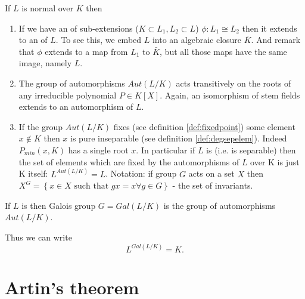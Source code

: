 \begin{remark}
  If $L$ is normal over $K$ then
  \begin{enumerate}
  \item If we have an  of sub-extensions
    ($K \subset L_1, L_2 \subset L$)
    $\phi: L_1 \cong L_2$ then it extends to an
     of $L$.  To see this, we embed $L$ into
    an algebraic closure $\bar{K}$. And remark that $\phi$ extends to a
    map from $L_1$ to $\bar{K}$, but all those maps have the same image,
    namely $L$.  
  \item The group of automorphisms $Aut\left(L/K\right)$ acts
    transitively on the roots of any irreducible polynomial $P \in
    K\left[X\right]$. Again, an isomorphism of stem fields extends to
    an automorphism of $L$.
  \item If the group $Aut\left(L/K\right)$ fixes (see definition
    \ref{def:fixedpoint}) some element $x 
    \notin K$ then $x$ is pure inseparable (see definition
    \ref{def:degsepelem}). Indeed $P_{min}\left(x, K\right)$ has a
    single root $x$. In particular if $L$ is
     (i.e. is separable) then
      the set of elements which are fixed  by the automorphisms  of $L$
      over K is just K itself: 
      $L^{Aut\left(L/K\right)} = L$.
      Notation: if group $G$ acts on a set $X$ then $X^G = \left\{x
      \in X \mbox{ such that } gx = x \forall g \in G\right\}$ - the
      set of invariants.
  \end{enumerate}
\end{remark}

\begin{definition}
  If $L$ is  then Galois group $G =
  Gal\left(L/K\right)$ is the group of automorphisms $Aut\left(L/K\right)$. 
  \label{def:galoisgroup}
\end{definition}

Thus we can write
\begin{equation}
  L^{Gal\left(L/K\right)} = K.
  \label{eq:lec5_2}
\end{equation}

\section{Artin's theorem}

